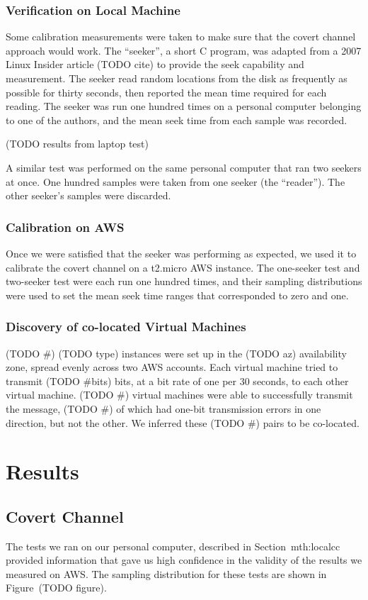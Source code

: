 \documentclass[conference]{IEEEtran}
\begin{document}
\subsubsection{Verification on Local Machine}
Some calibration measurements were taken to make sure that the covert channel approach would work.
The ``seeker'', a short C program, was adapted from a 2007 Linux Insider article (TODO cite) to provide the seek
  capability and measurement.
The seeker read random locations from the disk as frequently as possible for thirty seconds, then reported the mean
  time required for each reading.
The seeker was run one hundred times on a personal computer belonging to one of the authors, and the mean seek time
  from each sample was recorded.

(TODO results from laptop test)

A similar test was performed on the same personal computer that ran two seekers at once.
One hundred samples were taken from one seeker (the ``reader'').
The other seeker's samples were discarded.

\subsubsection{Calibration on AWS}
Once we were satisfied that the seeker was performing as expected, we used it to calibrate the covert channel on a
  t2.micro AWS instance.
The one-seeker test and two-seeker test were each run one hundred times, and their sampling distributions were
  used to set the mean seek time ranges that corresponded to zero and one.

\subsubsection{Discovery of co-located Virtual Machines}
(TODO \#) (TODO type) instances were set up in the (TODO az) availability zone, spread evenly across two AWS accounts.
Each virtual machine tried to transmit (TODO \#bits) bits, at a bit rate of one per 30 seconds, to each other virtual
  machine.
(TODO \#) virtual machines were able to successfully transmit the message, (TODO \#) of which had one-bit transmission
  errors in one direction, but not the other.
We inferred these (TODO \#) pairs to be co-located.

\section{Results}
\subsection{Covert Channel}
The tests we ran on our personal computer, described in Section~{mth:localcc} provided information that gave us high
  confidence in the validity of the results we measured on AWS. The sampling distribution for these tests are shown in
  Figure~(TODO figure).
\end{document}
